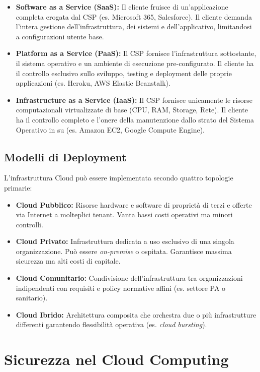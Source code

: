 \begin{itemize}
    \item \textbf{Software as a Service (SaaS):} Il cliente fruisce di un'applicazione completa erogata dal CSP (es. Microsoft 365, Salesforce). Il cliente demanda l'intera gestione dell'infrastruttura, dei sistemi e dell'applicativo, limitandosi a configurazioni utente base.
    \item \textbf{Platform as a Service (PaaS):} Il CSP fornisce l'infrastruttura sottostante, il sistema operativo e un ambiente di esecuzione pre-configurato. Il cliente ha il controllo esclusivo sullo sviluppo, testing e deployment delle proprie applicazioni (es. Heroku, AWS Elastic Beanstalk).
    \item \textbf{Infrastructure as a Service (IaaS):} Il CSP fornisce unicamente le risorse computazionali virtualizzate di base (CPU, RAM, Storage, Rete). Il cliente ha il controllo completo e l'onere della manutenzione dallo strato del Sistema Operativo in su (es. Amazon EC2, Google Compute Engine).
\end{itemize}

\subsection{Modelli di Deployment}
L'infrastruttura Cloud può essere implementata secondo quattro topologie primarie:
\begin{itemize}
    \item \textbf{Cloud Pubblico:} Risorse hardware e software di proprietà di terzi e offerte via Internet a molteplici tenant. Vanta bassi costi operativi ma minori controlli.
    \item \textbf{Cloud Privato:} Infrastruttura dedicata a uso esclusivo di una singola organizzazione. Può essere \textit{on-premise} o ospitata. Garantisce massima sicurezza ma alti costi di capitale.
    \item \textbf{Cloud Comunitario:} Condivisione dell'infrastruttura tra organizzazioni indipendenti con requisiti e policy normative affini (es. settore PA o sanitario).
    \item \textbf{Cloud Ibrido:} Architettura composita che orchestra due o più infrastrutture differenti garantendo flessibilità operativa (es. \textit{cloud bursting}).
\end{itemize}

\section{Sicurezza nel Cloud Computing}

